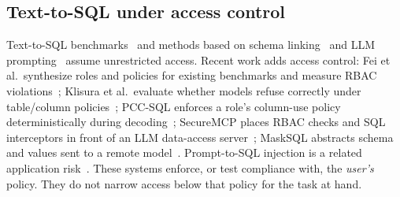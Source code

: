 \subsection{Text-to-SQL under access control}
Text-to-SQL benchmarks~\cite{yu2018spider,li2023bird} and methods based on schema
linking~\cite{wang2020ratsql,lei2020reexamining,li2023resdsql} and LLM prompting~\cite{pourreza2023dinsql,gao2024dailsql}
assume unrestricted access. Recent work adds access control: Fei et al.\ synthesize roles and policies for
existing benchmarks and measure RBAC violations~\cite{fei2026rbac}; Klisura et al.\ evaluate whether models
refuse correctly under table/column policies~\cite{klisura2026role}; PCC-SQL enforces a role's column-use
policy deterministically during decoding~\cite{miyamoto2026pccsql}; SecureMCP places RBAC checks and SQL
interceptors in front of an LLM data-access server~\cite{kim2026securemcp}; MaskSQL abstracts schema and
values sent to a remote model~\cite{abedini2025masksql}. Prompt-to-SQL injection is a related application
risk~\cite{pedro2025prompt}. These systems enforce, or test compliance with, the \emph{user's} policy.
They do not narrow access below that policy for the task at hand.

